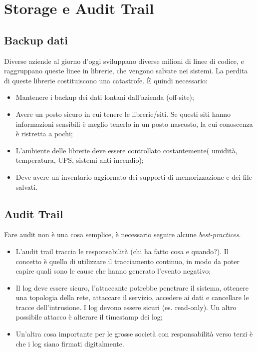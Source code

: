 \section{Storage e Audit Trail}
\label{sat}

\subsection{Backup dati}

Diverse aziende al giorno d'oggi sviluppano diverse milioni di linee di codice,
e raggruppano queste linee in librerie, che vengono salvate nei sistemi. La
perdita di queste librerie costituiscono una catastrofe. È quindi necessario:
\begin{itemize}
  \item Mantenere i backup dei dati lontani dall'azienda (off-site);
  \item Avere un posto sicuro in cui tenere le librerie/siti. Se questi siti
  hanno informazioni sensibili è meglio tenerlo in un posto nascosto, la cui
  conoscenza è ristretta a pochi;
  \item L'ambiente delle librerie deve essere controllato costantemente(
  umidità, temperatura, UPS, sistemi anti-incendio);
  \item Deve avere un inventario aggiornato dei supporti di memorizzazione e 
  dei file salvati.


\end{itemize}

\subsection{Audit Trail}

Fare audit non è una cosa semplice, è necessario seguire alcune
\textit{best-practices}.

\begin{itemize}
 \item L'audit trail traccia le responsabilità (chi ha fatto cosa e quando?).
 Il concetto è quello di utilizzare il tracciamento continuo, in modo da poter
 capire quali sono le cause che hanno generato l'evento negativo;
 \item Il log deve essere sicuro, l'attaccante potrebbe penetrare il sistema,
 ottenere una topologia della rete, attaccare il servizio, accedere ai dati e
 cancellare le tracce dell'intrusione. I log devono essere sicuri (es. 
 read-only). Un altro possibile attacco è alterare il timestamp dei log;
 \item Un'altra cosa importante per le grosse società con responsabilità verso
 terzi è che i log siano firmati digitalmente.

\end{itemize}

